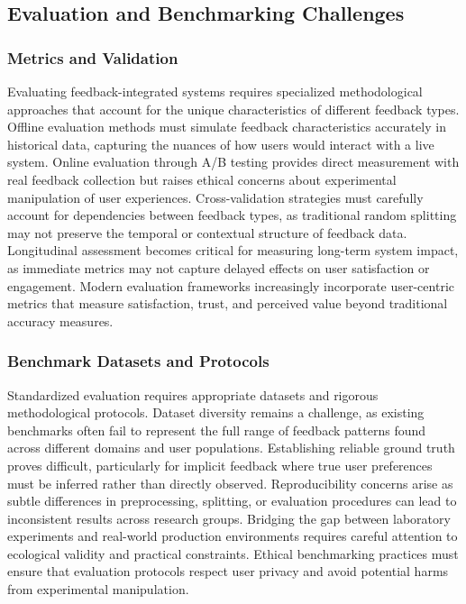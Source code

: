 \subsection{Evaluation and Benchmarking Challenges}

\subsubsection{Metrics and Validation}

Evaluating feedback-integrated systems requires specialized methodological approaches that account for the unique characteristics of different feedback types. Offline evaluation methods must simulate feedback characteristics accurately in historical data, capturing the nuances of how users would interact with a live system. Online evaluation through A/B testing provides direct measurement with real feedback collection but raises ethical concerns about experimental manipulation of user experiences. Cross-validation strategies must carefully account for dependencies between feedback types, as traditional random splitting may not preserve the temporal or contextual structure of feedback data. Longitudinal assessment becomes critical for measuring long-term system impact, as immediate metrics may not capture delayed effects on user satisfaction or engagement. Modern evaluation frameworks increasingly incorporate user-centric metrics that measure satisfaction, trust, and perceived value beyond traditional accuracy measures.

\subsubsection{Benchmark Datasets and Protocols}

Standardized evaluation requires appropriate datasets and rigorous methodological protocols. Dataset diversity remains a challenge, as existing benchmarks often fail to represent the full range of feedback patterns found across different domains and user populations. Establishing reliable ground truth proves difficult, particularly for implicit feedback where true user preferences must be inferred rather than directly observed. Reproducibility concerns arise as subtle differences in preprocessing, splitting, or evaluation procedures can lead to inconsistent results across research groups. Bridging the gap between laboratory experiments and real-world production environments requires careful attention to ecological validity and practical constraints. Ethical benchmarking practices must ensure that evaluation protocols respect user privacy and avoid potential harms from experimental manipulation.

